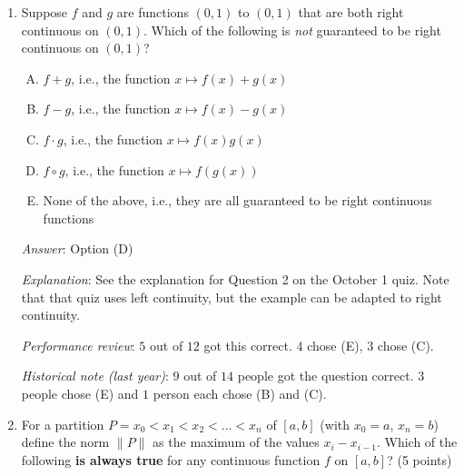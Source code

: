 \documentclass[10pt]{amsart}
\begin{document}
\begin{enumerate}
  {\em Performance review}: $7$ out of $12$ got this correct. $3$ chose
  (A), $1$ chose (A), $1$ chose (B).

  {\em Historical note (last year)}: $4$ out of $14$ people got this
  correct. $4$ people chose (E), $4$ people chose (A), $1$ person
  chose (D), and $1$ person left the question blank.

  {\em Action point}: It seems that many people don't have the correct
  conceptual picture of how to compose functions with piecewise
  definitions. {\em You need to spend some time to understand this --
  please do!} We will talk briefly about this in one of the subsequent
  review opportunities.
\item Suppose $f$ and $g$ are functions $(0,1)$ to $(0,1)$ that are
  both right continuous on $(0,1)$. Which of the following is {\em not}
  guaranteed to be right continuous on $(0,1)$?

  \begin{enumerate}[(A)]
  \item $f + g$, i.e., the function $x \mapsto f(x) + g(x)$
  \item $f - g$, i.e., the function $x \mapsto f(x) - g(x)$
  \item $f \cdot g$, i.e., the function $x \mapsto f(x)g(x)$
  \item $f \circ g$, i.e., the function $x \mapsto f(g(x))$
  \item None of the above, i.e., they are all guaranteed to be right
    continuous functions
  \end{enumerate}

  {\em Answer}: Option (D)

  {\em Explanation}: See the explanation for Question 2 on the October
  1 quiz. Note that that quiz uses left continuity, but the example
  can be adapted to right continuity.

  {\em Performance review}: $5$ out of $12$ got this correct. $4$
  chose (E), $3$ chose (C).

  {\em Historical note (last year)}: $9$ out
  of $14$ people got the question correct. $3$ people chose (E) and
  $1$ person each chose (B) and (C).

\item For a partition $P = x_0 < x_1 < x_2 < \dots < x_n$ of $[a,b]$
  (with $x_0 = a$, $x_n = b$) define the norm $\| P \|$ as the maximum
  of the values $x_i - x_{i-1}$. Which of the following {\bf is always
  true} for any continuous function $f$ on $[a,b]$? (5 points)


\end{enumerate}
\end{document}
